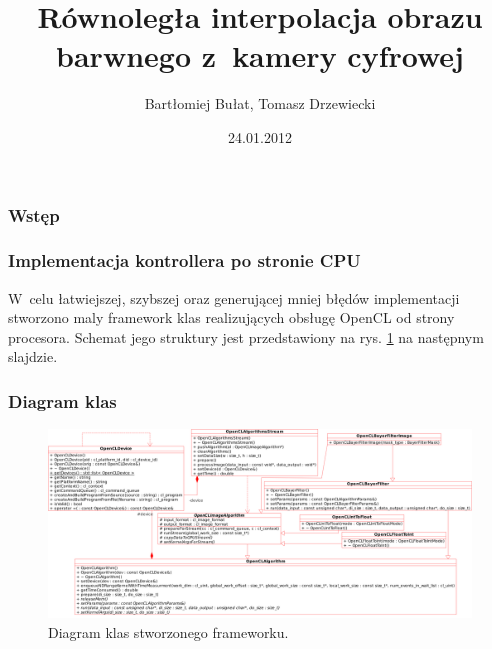 \documentclass{beamer}
\title[Interpolacja obrazu barwnego]{Równoległa interpolacja obrazu barwnego
  z~kamery cyfrowej}
\author[B. Bułat, T. Drzewiecki]{Bartłomiej Bułat, Tomasz Drzewiecki}
\date[2011]{24.01.2012}
\institute[AGH]
{Wydział EAIiIB\\ 
Katedra Automatyki i Inżynierii Biomedycznej
}
\begin{document}
{
 \begin{frame}
   \titlepage
 \end{frame}
}



\begin{frame}
\frametitle{Wstęp}

\end{frame}

\begin{frame}
  \frametitle{Implementacja kontrollera po stronie CPU}
  W~celu łatwiejszej, szybszej oraz generującej mniej błędów implementacji stworzono maly framework klas realizujących obsługę OpenCL od strony procesora.
Schemat jego struktury jest przedstawiony na rys. \ref{fig:class_diagram} na następnym slajdzie.
\end{frame}

\begin{frame}
  \frametitle{Diagram klas}
\begin{figure}
  \centering
  \includegraphics[width=0.6\linewidth]{class_diagram}
  \caption{Diagram klas stworzonego frameworku.}
  \label{fig:class_diagram}
\end{figure}
  
\end{frame}
\end{document}
